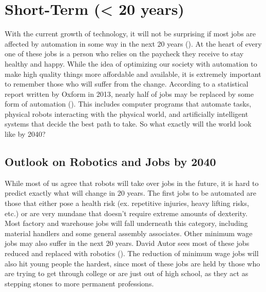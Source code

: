 \section{Short-Term (< 20 years)}
\label{sec:short}

With the current growth of technology, it will not be surprising if most jobs are affected by automation in some way in the next 20 years (\cite{1/2Jobs20Years}). At the heart of every one of these jobs is a person who relies on the paycheck they receive to stay healthy and happy. While the idea of optimizing our society with automation to make high quality things more affordable and available, it is extremely important to remember those who will suffer from the change. According to a statistical report written by Oxform in 2013, nearly half of jobs may be replaced by some form of automation (\cite{OxfordJobsAreComputerized}). This includes computer programs that automate tasks, physical robots interacting with the physical world, and artificially intelligent systems that decide the best path to take. So what exactly will the world look like by 2040?

\subsection{Outlook on Robotics and Jobs by 2040}

While most of us agree that robots will take over jobs in the future, it is hard to predict exactly what will change in 20 years. The first jobs to be automated are those that either pose a health risk (ex. repetitive injuries, heavy lifting risks, etc.) or are very mundane that doesn't require extreme amounts of dexterity. Most factory and warehouse jobs will fall underneath this category, including material handlers and some general assembly associates. Other minimum wage jobs may also suffer in the next 20 years. David Autor sees most of these jobs reduced and replaced with robotics (\cite{WhyStillSoManyJobs}). The reduction of minimum wage jobs will also hit young people the hardest, since most of these jobs are held by those who are trying to get through college or are just out of high school, as they act as stepping stones to more permanent professions. 

